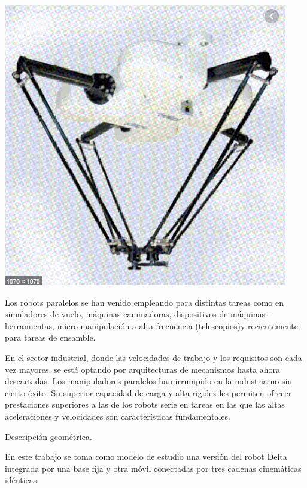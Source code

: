 \documentclass[a4paper,10pt]{article}
\begin{document}
\begin{center}
\includegraphics[width=\textwidth]{Imagen3.PNG}
\end{center}

Los robots paralelos se han venido empleando para distintas tareas como en simuladores de vuelo, máquinas caminadoras, dispositivos de máquinas–herramientas, micro manipulación a alta frecuencia (telescopios)y recientemente para tareas de ensamble.

En el sector industrial, donde las velocidades de trabajo y los requisitos son cada vez mayores, se está optando por arquitecturas de mecanismos hasta ahora descartadas. Los manipuladores paralelos han irrumpido en la industria no sin cierto éxito. Su superior capacidad de carga y alta rigidez les permiten ofrecer prestaciones superiores a las de los robots serie en tareas en las que las altas aceleraciones y velocidades son características fundamentales.

Descripción geométrica.

En este trabajo se toma como modelo de estudio una versión del robot Delta integrada por una base fija y otra móvil conectadas por tres cadenas cinemáticas idénticas.
\end{document}
